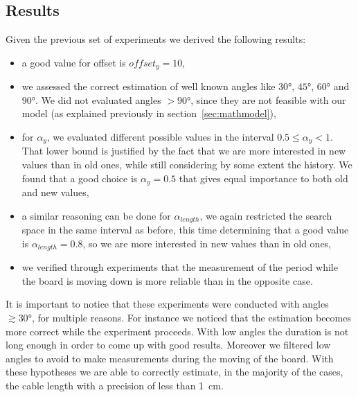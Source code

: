 \subsection{Results}
\label{sec:results}
Given the previous set of experiments we derived the following results:
\begin{itemize}
	\item a good value for offset is $offset_y = 10$,
	\item we assessed the correct estimation of well known angles like $30\si{\degree}$, $45\si{\degree}$, $60\si{\degree}$ and $90\si{\degree}$. We did not evaluated angles $> 90\si{\degree}$, since they are not feasible with our model (as explained previously in section~\ref{sec:mathmodel}),
	\item for $\alpha_y$, we evaluated different possible values in the interval $0.5 \leq \alpha_y < 1 $. That lower bound is justified by the fact that we are more interested in new values than in old ones, while still considering by some extent the history. We found that a good choice is $\alpha_y = 0.5$ that gives equal importance to both old and new values,
	\item a similar reasoning can be done for $\alpha_{length}$, we again restricted the search space in the same interval as before, this time determining that a good value is $\alpha_{length} = 0.8$, so we are more interested in new values than in old ones,
	\item we verified through experiments that the measurement of the period while the board is moving down is more reliable than in the opposite case.
\end{itemize}
It is important to notice that these experiments were conducted with angles $\gtrsim 30\si{\degree}$, for multiple reasons. For instance we noticed that the estimation becomes more correct while the experiment proceeds. With low angles the duration is not long enough in order to come up with good results. Moreover we filtered low angles to avoid to make measurements during the moving of the board.
With these hypotheses we are able to correctly estimate, in the majority of the cases, the cable length with a precision of less than \SI{1}{\cm}.
\pagebreak


